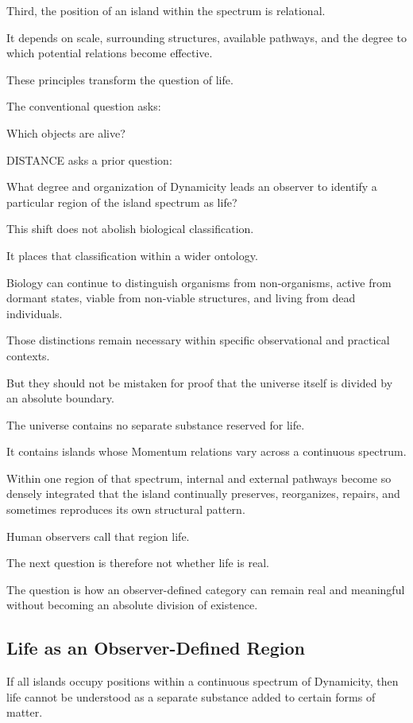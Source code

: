 Third, the position of an island within the spectrum is relational.

It depends on scale, surrounding structures, available pathways, and the degree to which potential relations become effective.

These principles transform the question of life.

The conventional question asks:

Which objects are alive?

DISTANCE asks a prior question:

What degree and organization of Dynamicity leads an observer to identify a particular region of the island spectrum as life?

This shift does not abolish biological classification.

It places that classification within a wider ontology.

Biology can continue to distinguish organisms from non-organisms, active from dormant states, viable from non-viable structures, and living from dead individuals.

Those distinctions remain necessary within specific observational and practical contexts.

But they should not be mistaken for proof that the universe itself is divided by an absolute boundary.

The universe contains no separate substance reserved for life.

It contains islands whose Momentum relations vary across a continuous spectrum.

Within one region of that spectrum, internal and external pathways become so densely integrated that the island continually preserves, reorganizes, repairs, and sometimes reproduces its own structural pattern.

Human observers call that region life.

The next question is therefore not whether life is real.

The question is how an observer-defined category can remain real and meaningful without becoming an absolute division of existence.

\subsection*{\textbf{Life as an Observer-Defined Region}} 

If all islands occupy positions within a continuous spectrum of Dynamicity, then life cannot be understood as a separate substance added to certain forms of matter.


